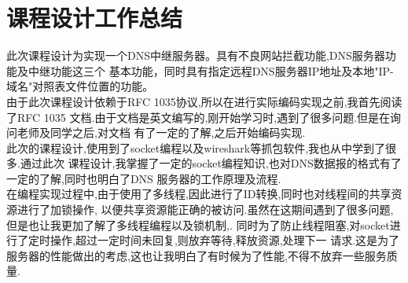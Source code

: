 \documentclass{ctexart}
\begin{document}
\section{课程设计工作总结}
\label{summary}
    此次课程设计为实现一个DNS中继服务器。具有不良网站拦截功能,DNS服务器功能及中继功能这三个
基本功能，同时具有指定远程DNS服务器IP地址及本地"IP-域名"对照表文件位置的功能。\\

    由于此次课程设计依赖于RFC 1035协议,所以在进行实际编码实现之前,我首先阅读了RFC 1035
文档.由于文档是英文编写的,刚开始学习时,遇到了很多问题.但是在询问老师及同学之后,对文档
有了一定的了解,之后开始编码实现.\\

    此次的课程设计,使用到了socket编程以及wireshark等抓包软件,我也从中学到了很多.通过此次
课程设计,我掌握了一定的socket编程知识,也对DNS数据报的格式有了一定的了解,同时也明白了DNS
服务器的工作原理及流程.\\

    在编程实现过程中,由于使用了多线程,因此进行了ID转换,同时也对线程间的共享资源进行了加锁操作,
以便共享资源能正确的被访问.虽然在这期间遇到了很多问题,但是也让我更加了解了多线程编程以及锁机制,.
同时为了防止线程阻塞,对socket进行了定时操作,超过一定时间未回复,则放弃等待,释放资源,处理下一
请求.这是为了服务器的性能做出的考虑,这也让我明白了有时候为了性能,不得不放弃一些服务质量.
\end{document}

